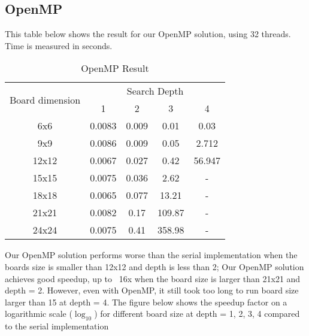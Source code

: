 \subsection{OpenMP}
This table below shows the result for our OpenMP solution, using 32 threads. Time is measured in seconds. 
\begin{table}[!htbp]
\centering
\begin{tabular}{|c|c|c|c|c|} 
\hline
\multirow{2}{*}{Board dimension} & \multicolumn{4}{c|}{Search Depth}     \\ 
\cline{2-5}
                                 & 1       & 2      & 3       & 4        \\ 
\hline
6x6                              & 0.0083 & 0.009 & 0.01    & 0.03    \\ 
\hline
9x9                              & 0.0086 & 0.009 & 0.05    & 2.712   \\ 
\hline
12x12                            & 0.0067 & 0.027 & 0.42    & 56.947  \\ 
\hline
15x15                            & 0.0075 & 0.036 & 2.62    & -        \\ 
\hline
18x18                            & 0.0065 & 0.077 & 13.21   & -        \\ 
\hline
21x21                            & 0.0082 & 0.17  & 109.87  & -        \\ 
\hline
24x24                            & 0.0075 & 0.41  & 358.98  & -        \\
\hline
\end{tabular}
\caption{OpenMP Result}
\end{table}

\noindent
Our OpenMP solution performs worse than the serial implementation when the boards size is smaller than 12x12 and depth is less than 2; Our OpenMP solution achieves good speedup, up to ~16x when the board size is larger than 21x21 and depth = 2. However, even with OpenMP, it still took too long to run board size larger than 15 at depth = 4. The figure  below shows the speedup factor on a logarithmic scale ($\log_{10}$) for different board size at depth = 1, 2, 3, 4 compared to the serial implementation\\



